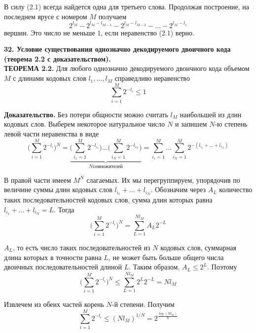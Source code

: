 \documentclass[14pt]{article}
\begin{document}
В силу (2.1) всегда найдется одна для третьего слова. Продолжая построение, на последнем ярусе с номером \(M\) получаем
\begin{displaymath}
    2^{l_M} - 2^{l_M-l_{M-1}} - 2^{l_M-l_{M-2}} - \ldots -  2^{l_M-l_{1}}
\end{displaymath}
вершин. Это число не меньше 1, если неравенство (2.1) верно.

\bigskip
\textbf{32. Условие существования однозначно декодируемого двоичного кода (теорема 2.2 с доказательством).} \\

\textbf{ТЕОРЕМА 2.2.} Для любого однозначно декодируемого двоичного кода объемом \(M\) с длинами кодовых слов \(l_1,\ldots,l_M\) справедливо неравенство
\begin{displaymath}
    \sum_{i=1}^{M} 2^{-l_i} \leq 1
\end{displaymath}

\textbf{Доказательство.} Без потери общности можно считать \(l_M\) наибольшей из длин кодовых слов. Выберем некоторое натуральное число \(N\) и запишем \(N\)-ю степень левой части неравенства в виде
\begin{displaymath}
    \Big(\sum_{i=1}^{M} 2^{-l_i} \Big)^N = \underbrace{\Big(\sum_{i_1=1}^{M} 2^{-l_{i_1}} \Big) \ldots \Big(\sum_{i_N=1}^{M} 2^{-l_{i_N}} \Big)}_{N сомножителей} = \sum_{i_1=1}^{M} \ldots \sum_{i_N=1}^{M} 2^{-(l_{i_1}+\ldots+l_{i_N})}
\end{displaymath}

В правой части имеем \(M^N\) слагаемых. Их мы перегруппируем, упорядочив по величине суммы длин кодовых слов \(l_{i_1}+\ldots+l_{i_N}\). Обозначим через \(A_L\) количество таких последовательностей кодовых слов, сумма длин которых равна \(l_{i_1}+\ldots+l_{i_N} = L\). Тогда
\begin{displaymath}
    \Big(\sum_{i=1}^{M} 2^{-l_i} \Big)^N = \sum_{L=1}^{Nl_M} A_L 2^{-L}
\end{displaymath}

\(A_L\), то есть число таких последовательностей из \(N\) кодовых слов, суммарная длина которых в точности равна \(L\), не может быть больше общего числа двоичных последовательностей длиной \(L\). Таким образом, \(A_L \leq 2^L\). Поэтому
\begin{displaymath}
    \Big(\sum_{i=1}^{M} 2^{-l_i} \Big)^N \leq \sum_{L=1}^{Nl_M} 2^L 2^{-L} = Nl_M
\end{displaymath}

Извлечем из обеих частей корень \(N\)-й степени. Получим
\begin{displaymath}
    \sum_{i=1}^{M} 2^{-l_i} \leq (Nl_M)^{1/N} = 2^{\frac{\log (Nl_M)}{N}}
\end{displaymath}
\end{document}
